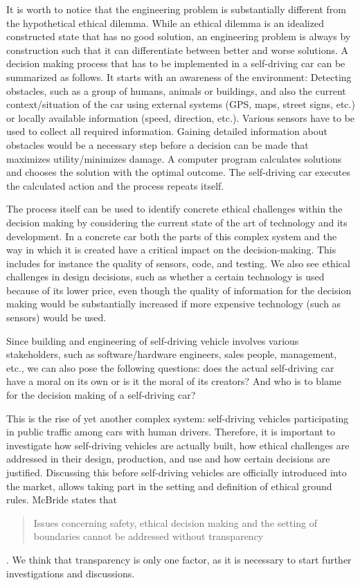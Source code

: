It is worth to notice that the engineering problem is substantially different from the hypothetical ethical dilemma. While an ethical dilemma is an idealized constructed state that has no good solution, an engineering problem is always by construction such that it can differentiate between better and worse solutions. A decision making process that has to be implemented in a self-driving car can be summarized as follows. It starts with an awareness of the environment: Detecting obstacles, such as a group of humans, animals or buildings, and also the current context/situation of the car using external systems (GPS, maps, street signs, etc.) or locally available information (speed, direction, etc.). Various sensors have to be used to collect all required information. Gaining detailed information about obstacles would be a necessary step before a decision can be made that maximizes utility/minimizes damage. A computer program calculates solutions and chooses the solution with the optimal outcome. The self-driving car executes the calculated action and the process repeats itself.

The process itself can be used to identify concrete ethical challenges within the decision making by considering the current state of the art of technology and its development. In a concrete car both the parts of this complex system and the way in which it is created have a critical impact on the decision-making. This includes for instance the quality of sensors, code, and testing. We also see ethical challenges in design decisions, such as whether a certain technology is used because of its lower price, even though the quality of information for the decision making would be substantially increased if more expensive technology (such as sensors) would be used.

Since building and engineering of self-driving vehicle involves various stakeholders, such as software/hardware engineers, sales people, management, etc., we can also pose the following questions: does the actual self-driving car have a moral on its own or is it the moral of its creators? And who is to blame for the decision making of a self-driving car?

This is the rise of yet another complex system: self-driving vehicles participating in public traffic among cars with human drivers. Therefore, it is important to investigate how self-driving vehicles are actually built, how ethical challenges are addressed in their design, production, and use and how certain decisions are justified. Discussing this before self-driving vehicles are officially introduced into the market, allows taking part in the setting and definition of ethical ground rules. McBride states that \blockquote{Issues concerning safety, ethical decision making and the setting of boundaries cannot be addressed without transparency} \cite{McBride:2016:EDC:2874239.2874265}. We think that transparency is only one factor, as it is necessary to start further investigations and discussions. 


